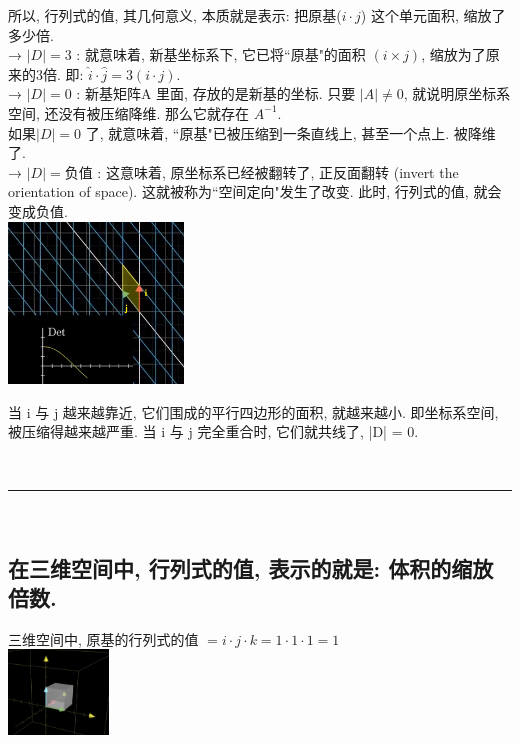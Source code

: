 \documentclass[UTF8]{ctexart}
\begin{document}
所以, 行列式的值, 其几何意义, 本质就是表示: 把原基($i \cdot j$) 这个单元面积, 缩放了多少倍.\\

→ $| D |=3$ : 就意味着, 新基坐标系下, 它已将``原基"的面积 $ (i×j)$, 缩放为了原来的3倍. 即:  $\hat{i} \cdot \hat{j} = 3(i \cdot j) $. \\


→ $| D |=0 $ : 新基矩阵A 里面, 存放的是新基的坐标. 只要 $|A| \ne 0$, 就说明原坐标系空间, 还没有被压缩降维. 那么它就存在 $ A^{-1}$. \\
如果$| D |=0 $ 了, 就意味着, ``原基"已被压缩到一条直线上, 甚至一个点上. 被降维了.\\

→ $|D|=负值 $ : 这意味着, 原坐标系已经被翻转了, 正反面翻转 (invert the orientation of space). 这就被称为``空间定向"发生了改变. 此时, 行列式的值, 就会变成负值.\\

\includegraphics[width=0.35\textwidth]{img/0045.png}

当 i 与 j 越来越靠近, 它们围成的平行四边形的面积, 就越来越小. 即坐标系空间, 被压缩得越来越严重. 当 i 与 j 完全重合时, 它们就共线了, |D| = 0.



~\\
\hrule
~\\

\subsection{在三维空间中, 行列式的值, 表示的就是: 体积的缩放倍数.}

三维空间中, 原基的行列式的值 $= i \cdot j \cdot k = 1 \cdot 1 \cdot 1 = 1$ \\

\includegraphics[width=0.2\textwidth]{img/0047.png}\\
\end{document}
